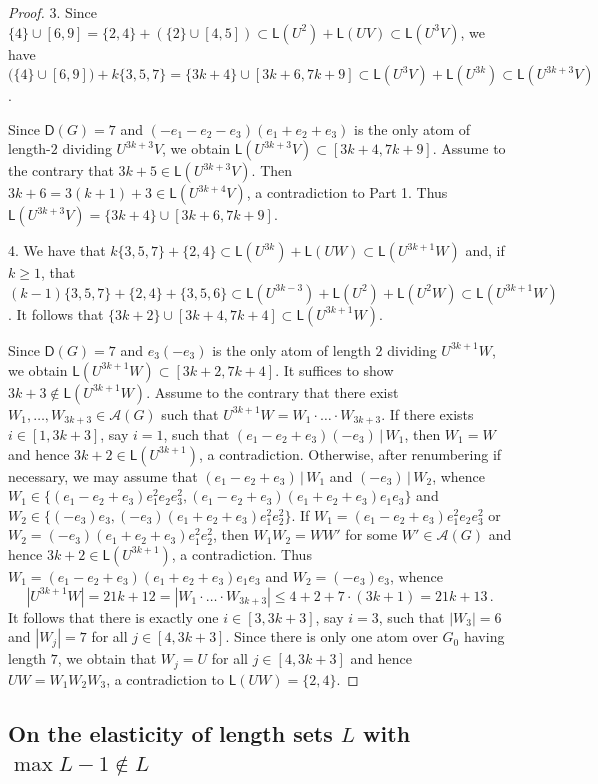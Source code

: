 \documentclass[a4paper, 10pt]{amsart}
\theoremstyle{plain}
\theoremstyle{definition}
\theoremstyle{definition}
\numberwithin{equation}{section}
\renewcommand{\t}{\, | \,}
\begin{document}
\begin{proof}
	
3.  Since $\{4\}\cup [6,9]=\{2,4\}+(\{2\}\cup [4,5])\subset\mathsf L(U^2)+\mathsf L(UV)\subset \mathsf L(U^3V)$,
	we have $\big(\{4\}\cup [6,9]\big)+k\{3,5,7\}=\{3k+4\}\cup [3k+6, 7k+9]\subset \mathsf L(U^3V)+\mathsf L(U^{3k}) \subset\mathsf L(U^{3k+3}V)$.
	
	Since $\mathsf D(G)=7$ and $(-e_1-e_2-e_3)(e_1+e_2+e_3)$ is the only  atom  of length-$2$  dividing $U^{3k+3}V$, we obtain $\mathsf L(U^{3k+3}V)\subset[3k+4, 7k+9]$.
	Assume to  the contrary that $3k+5\in \mathsf L(U^{3k+3}V)$. Then
	$3k+6=3(k+1)+3\in \mathsf L(U^{3k+4}V)$, a contradiction to Part 1. Thus $\mathsf L(U^{3k+3}V)=\{3k+4\}\cup [3k+6, 7k+9]$.	
	
	
4. 
	We have that
$k\{3,5,7\}+\{2,4\}\subset \mathsf L(U^{3k})+\mathsf L(UW)\subset \mathsf L(U^{3k+1}W)$
	 and, if $k \ge 1$, that
	 $(k-1)\{3,5,7\}+\{2,4\}+\{3,5,6\}\subset \mathsf L(U^{3k-3})+\mathsf L(U^2)+\mathsf L(U^2W)\subset \mathsf L(U^{3k+1}W)$.
	 It follows that $\{3k+2\}\cup [3k+4,7k+4]\subset \mathsf L(U^{3k+1}W)$.
	
	
	Since $\mathsf D(G)=7$ and $e_3(-e_3)$ is the only atom of length $2$ dividing $U^{3k+1}W$, we obtain $\mathsf L(U^{3k+1}W)\subset[3k+2, 7k+4]$.
	It suffices to show $3k+3\not\in \mathsf L(U^{3k+1}W)$. Assume to  the contrary that there exist $W_1,\ldots, W_{3k+3}\in \mathcal A(G)$  such that $U^{3k+1}W=W_1\cdot\ldots\cdot W_{3k+3}$.
	If there exists $i\in [1,3k+3]$, say $i=1$, such that $(e_1-e_2+e_3)(-e_3)\t W_1$, then $W_1=W$ and hence  $3k+2\in \mathsf L(U^{3k+1})$, a contradiction.	
	Otherwise, after renumbering if necessary, we may assume that $(e_1-e_2+e_3)\t W_1$ and  $(-e_3)\t W_2$, whence
	$W_1\in \{(e_1-e_2+e_3)e_1^2e_2e_3^2, (e_1-e_2+e_3)(e_1+e_2+e_3)e_1e_3\}$ and  $W_2\in \{(-e_3)e_3, (-e_3)(e_1+e_2+e_3)e_1^2e_2^2\}$.
	If $W_1=(e_1-e_2+e_3)e_1^2e_2e_3^2$ or $W_2=(-e_3)(e_1+e_2+e_3)e_1^2e_2^2$, then $W_1W_2=WW'$ for some $W'\in \mathcal A(G)$ and hence  $3k+2\in \mathsf L(U^{3k+1})$, a contradiction.	
	Thus $W_1=(e_1-e_2+e_3)(e_1+e_2+e_3)e_1e_3$ and  $W_2=(-e_3)e_3$, whence
	\[
	|U^{3k+1}W|=21k+12=|W_1\cdot\ldots\cdot W_{3k+3}|\le 4+2+7\cdot (3k+1)=21k+13\,.
	\]
	It follows that there is exactly one $i\in [3,3k+3]$, say $i=3$, such that $|W_3|=6$ and $|W_j|=7$ for all $j\in [4, 3k+3]$. Since there is only one atom over $G_0$ having length $7$, we obtain that $W_j=U$ for all $j\in [4, 3k+3]$ and hence $UW=W_1W_2W_3$, a contradiction to $\mathsf L(UW)=\{2,4\}$.
\end{proof}


\smallskip
\subsection{On the elasticity of length sets $L$  with $\max L - 1 \notin L$}~
\end{document}
